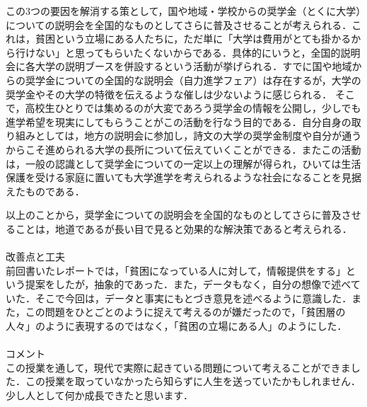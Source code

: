 \documentclass[10pt, a4paper]{jsarticle}
\begin{document}

  この3つの要因を解消する策として，国や地域・学校からの奨学金（とくに大学）についての説明会を全国的なものとしてさらに普及させることが考えられる．これは，貧困という立場にある人たちに，ただ単に「大学は費用がとても掛かるから行けない」と思ってもらいたくないからである．具体的にいうと，全国的説明会に各大学の説明ブースを併設するという活動が挙げられる．すでに国や地域からの奨学金についての全国的な説明会（自力進学フェア）は存在するが，大学の奨学金やその大学の特徴を伝えるような催しは少ないように感じられる． そこで，高校生ひとりでは集めるのが大変であろう奨学金の情報を公開し，少しでも進学希望を現実にしてもらうことがこの活動を行なう目的である．自分自身の取り組みとしては，地方の説明会に参加し，詩文の大学の奨学金制度や自分が通うからこそ進められる大学の長所について伝えていくことができる．またこの活動は，一般の認識として奨学金についての一定以上の理解が得られ，ひいては生活保護を受ける家庭に置いても大学進学を考えられるような社会になることを見据えたものである．

  以上のことから，奨学金についての説明会を全国的なものとしてさらに普及させることは，地道であるが長い目で見ると効果的な解決策であると考えられる．\\ \\
  改善点と工夫 \\
  前回書いたレポートでは，「貧困になっている人に対して，情報提供をする」という提案をしたが，抽象的であった．また，データもなく，自分の想像で述べていた．そこで今回は，データと事実にもとづき意見を述べるように意識した．また，この問題をひとごとのように捉えて考えるのが嫌だったので，「貧困層の人々」のように表現するのではなく，「貧困の立場にある人」のようにした． \\ \\
  コメント \\
  この授業を通して，現代で実際に起きている問題について考えることができました．この授業を取っていなかったら知らずに人生を送っていたかもしれません．少し人として何か成長できたと思います．

  \begin{thebibliography}{9}

  \end{thebibliography}

  
\end{document}
